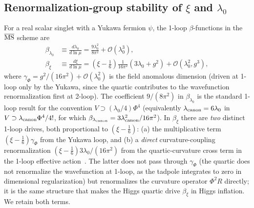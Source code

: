 \documentclass[pdflatex,sn-mathphys-num]{sn-jnl}
\theoremstyle{thmstyleone}
\begin{document}
\subsection{Renormalization-group stability of $\xi$ and $\lambda_0$}

For a real scalar singlet with a Yukawa fermion $\psi$, the 1-loop $\beta$-functions in the $\overline{\rm MS}$ scheme are~\cite{Ford1982,Buchbinder1992}
\begin{align}
\beta_{\lambda_0}&\equiv\frac{d\lambda_0}{d\ln\mu}=\frac{9\lambda_0^2}{8\pi^2}+\mathcal{O}(\lambda_0^3),
\label{eq:blam}\\
\beta_\xi&\equiv\frac{d\xi}{d\ln\mu}=(\xi-\tfrac{1}{6})\frac{1}{16\pi^2}\left(3\lambda_0+g^2\right)+\mathcal{O}(\lambda_0^2,g^3),
\label{eq:bxi}
\end{align}
where $\gamma_\Phi=g^2/(16\pi^2)+\mathcal{O}(\lambda_0^2)$ is the field anomalous dimension (driven at 1-loop only by the Yukawa, since the quartic contributes to the wavefunction renormalization first at 2-loop). The coefficient $9/(8\pi^2)$ in $\beta_{\lambda_0}$ is the standard 1-loop result for the convention $V\supset(\lambda_0/4)\Phi^4$ (equivalently $\lambda_{\rm canon}=6\lambda_0$ in $V\supset\lambda_{\rm canon}\Phi^4/4!$, for which $\beta_{\lambda_{\rm canon}}=3\lambda_{\rm canon}^2/16\pi^2$). In $\beta_\xi$ there are \emph{two} distinct 1-loop drives, both proportional to $(\xi-\frac16)$: (a) the multiplicative term $(\xi-\frac16)\gamma_\Phi$ from the Yukawa loop, and (b) a \emph{direct} curvature-coupling renormalization $(\xi-\frac16)3\lambda_0/(16\pi^2)$ from the quartic-curvature cross term in the 1-loop effective action~\cite{BirrellDavies,Buchbinder1992}. The latter does not pass through $\gamma_\Phi$ (the quartic does not renormalize the wavefunction at 1-loop, as the tadpole integrates to zero in dimensional regularization) but renormalizes the curvature operator $\Phi^2R$ directly; it is the same structure that makes the Higgs quartic drive $\beta_\xi$ in Higgs inflation. We retain both terms.
\end{document}
